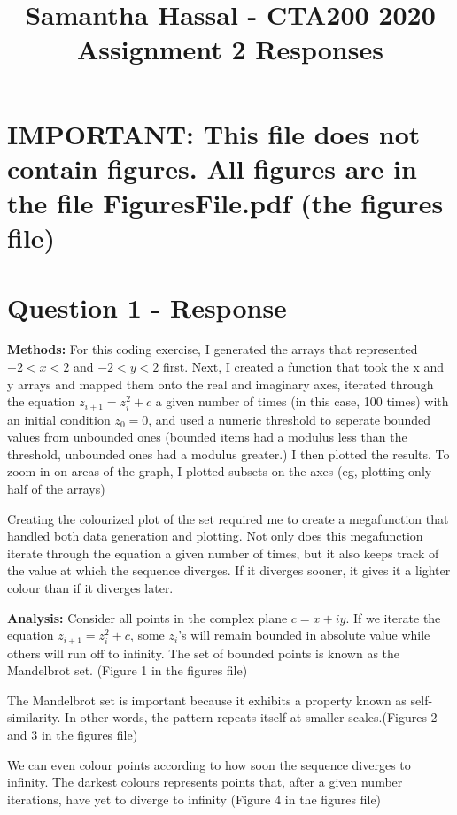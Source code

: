 \documentclass{article}
\title{Samantha Hassal - CTA200 2020 Assignment 2 Responses}
\date{}
\begin{document}
\maketitle

\section*{IMPORTANT: This file does not contain figures. All figures are in the file FiguresFile.pdf (the figures file)}
\section*{Question 1 - Response}
\textbf{Methods:} For this coding exercise, I generated the arrays that represented  $-2 < x < 2$ and $-2 < y < 2$ first. Next, I created a function that took the x and y arrays and mapped them onto the real and imaginary axes, iterated through the equation $z_{i + 1} = z_i^2 + c$ a given number of times (in this case, 100 times) with an initial condition $z_0 = 0$, and used a numeric threshold to seperate bounded values from unbounded ones (bounded items had a modulus less than the threshold, unbounded ones had a modulus greater.) I then plotted the results. To zoom in on areas of the graph, I plotted subsets on the axes (eg, plotting only half of the arrays)

Creating the colourized plot of the set required me to create a megafunction that handled both data generation and plotting. Not only does this megafunction iterate through the equation a given number of times, but it also keeps track of the value at which the sequence diverges. If it diverges sooner, it gives it a lighter colour than if it diverges later. 

\textbf{Analysis:} Consider all points in the complex plane $c = x + iy$. If we iterate the equation $z_{i + 1} = z_i^2 + c$, some $z_i$'s will remain bounded in absolute value while others will run off to infinity. The set of bounded points is known as the Mandelbrot set. (Figure 1 in the figures file)

The Mandelbrot set is important because it exhibits a property known as self-similarity. In other words, the pattern repeats itself at smaller scales.(Figures 2 and 3 in the figures file)

We can even colour points according to how soon the sequence diverges to infinity. The darkest colours represents points that, after a given number iterations, have yet to diverge to infinity (Figure 4 in the figures file)
\end{document}
